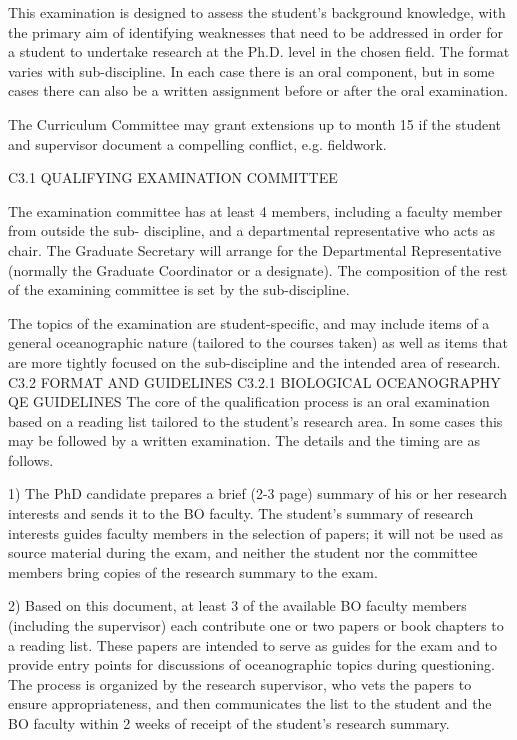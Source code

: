 \documentclass{article}
\begin{document}
This examination is designed to assess the student's background knowledge, with the primary aim of identifying weaknesses that need to be addressed in order for a student to undertake research at the Ph.D. level in the chosen field. The format varies with sub-discipline. In each case there is an oral component, but in some cases there can also be a written assignment before or after the oral examination.

The Curriculum Committee may grant extensions up to month 15 if the student and supervisor document a compelling conflict, e.g. fieldwork.
 

C3.1	QUALIFYING EXAMINATION COMMITTEE

The examination committee has at least 4 members, including a faculty member from outside the sub- discipline, and a departmental representative who acts as chair. The Graduate Secretary will arrange for the Departmental Representative (normally the Graduate Coordinator or a designate). The composition of the rest of the examining committee is set by the sub-discipline.

The topics of the examination are student-specific, and may include items of a general oceanographic nature (tailored to the courses taken) as well as items that are more tightly focused on the sub-discipline and the intended area of research.
C3.2	FORMAT AND GUIDELINES
C3.2.1  BIOLOGICAL OCEANOGRAPHY QE GUIDELINES
The core of the qualification process is an oral examination based on a reading list tailored to the student’s research area. In some cases this may be followed by a written examination. The details and the timing are as follows.

1)	The PhD candidate prepares a brief (2-3 page) summary of his or her research interests and sends it to the BO faculty. The student’s summary of research interests guides faculty members in the selection of papers; it will not be used as source material during the exam, and neither the student nor the committee members bring copies of the research summary to the exam.

2)	Based on this document, at least 3 of the available BO faculty members (including the supervisor) each contribute one or two papers or book chapters to a reading list. These papers are intended to serve as guides for the exam and to provide entry points for discussions of oceanographic topics during questioning. The process is organized by the research supervisor, who vets the papers to ensure appropriateness, and then communicates the list to the student and the BO faculty within 2 weeks of receipt of the student’s research summary.
\end{document}
